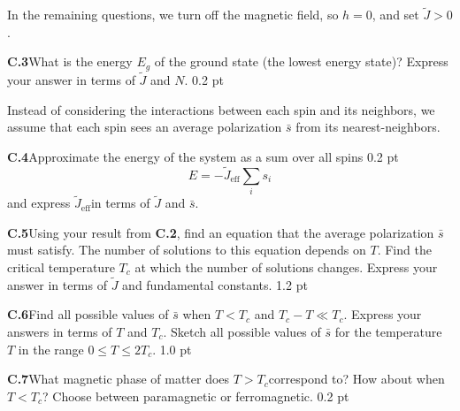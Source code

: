 In the remaining questions, we turn off the magnetic field, so $h = 0$, and set
$\tilde{J} > 0$.

\textbf{C.3}\quad What is the energy $E_g$ of the ground state (the lowest
energy state)? Express your answer in terms of $\tilde{J}$ and $N$.
\hfill 0.2 pt

Instead of considering the interactions between each spin and its neighbors,
we assume that each spin sees an average polarization $\bar{s}$ from its
nearest-neighbors.

\textbf{C.4}\quad Approximate the energy of the system as a sum over all spins
\hfill 0.2 pt
\[
E = -\tilde{J}_{\mathrm{eff}} \sum_i s_i
\]
and express $\tilde{J}_{\mathrm{eff}}$in terms of $\tilde{J}$ and $\bar{s}$.

\textbf{C.5}\quad Using your result from \textbf{C.2}, find an equation that the
average polarization $\bar{s}$ must satisfy. The number of solutions to this
equation depends on $T$. Find the critical temperature $T_c$ at which the
number of solutions changes. Express your answer in terms of $\tilde{J}$ and
fundamental constants. \hfill 1.2 pt

\textbf{C.6}\quad Find all possible values of $\bar{s}$ when $T < T_c$ and
$T_c - T \ll T_c$. Express your answers in terms of $T$ and $T_c$. Sketch all
possible values of $\bar{s}$ for the temperature $T$ in the range
$0 \leq T \leq 2T_c$. \hfill 1.0 pt

\textbf{C.7}\quad What magnetic phase of matter does $T > T_c$correspond to?
How about when $T < T_c$? Choose between paramagnetic or ferromagnetic.
\hfill 0.2 pt
